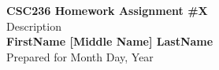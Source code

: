 \begin{titlepage}
    \null %
    \vfill
    \begin{center}
        {\fontsize{40}{48}\selectfont \bfseries CSC236 Homework Assignment \#X}
        \vspace{20pt} \\
        {\LARGE Description} \\
        \vspace{20pt}
        \textbf{FirstName [Middle Name] LastName}
        \vspace{8pt}
        \\ Prepared for Month Day, Year
    \end{center}
    \vfill
\end{titlepage}
